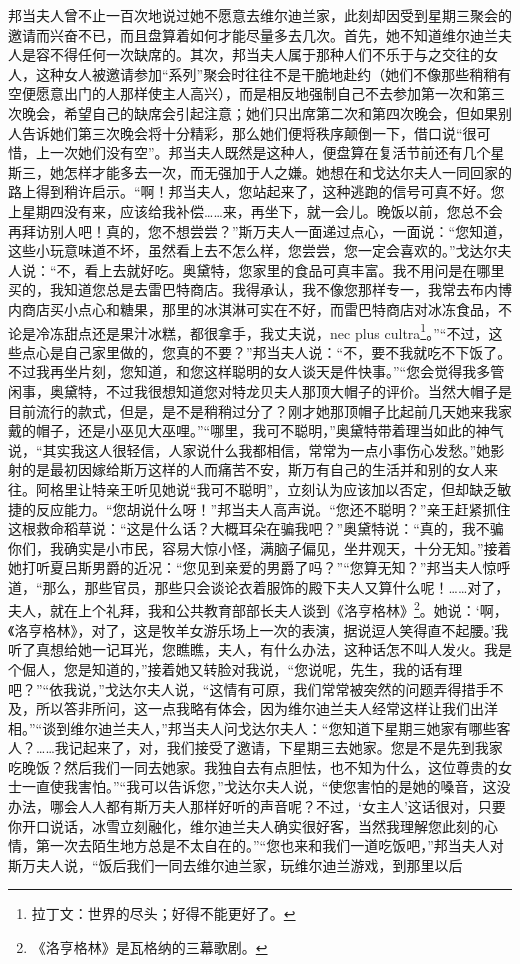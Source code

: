 \par 邦当夫人曾不止一百次地说过她不愿意去维尔迪兰家，此刻却因受到星期三聚会的邀请而兴奋不已，而且盘算着如何才能尽量多去几次。首先，她不知道维尔迪兰夫人是容不得任何一次缺席的。其次，邦当夫人属于那种人们不乐于与之交往的女人，这种女人被邀请参加“系列”聚会时往往不是干脆地赴约（她们不像那些稍稍有空便愿意出门的人那样使主人高兴），而是相反地强制自己不去参加第一次和第三次晚会，希望自己的缺席会引起注意；她们只出席第二次和第四次晚会，但如果别人告诉她们第三次晚会将十分精彩，那么她们便将秩序颠倒一下，借口说“很可惜，上一次她们没有空”。邦当夫人既然是这种人，便盘算在复活节前还有几个星斯三，她怎样才能多去一次，而无强加于人之嫌。她想在和戈达尔夫人一同回家的路上得到稍许启示。“啊！邦当夫人，您站起来了，这种逃跑的信号可真不好。您上星期四没有来，应该给我补偿……来，再坐下，就一会儿。晚饭以前，您总不会再拜访别人吧！真的，您不想尝尝？”斯万夫人一面递过点心，一面说：“您知道，这些小玩意味道不坏，虽然看上去不怎么样，您尝尝，您一定会喜欢的。”戈达尔夫人说：“不，看上去就好吃。奥黛特，您家里的食品可真丰富。我不用问是在哪里买的，我知道您总是去雷巴特商店。我得承认，我不像您那样专一，我常去布内博内商店买小点心和糖果，那里的冰淇淋可实在不好，而雷巴特商店对冰冻食品，不论是冷冻甜点还是果汁冰糕，都很拿手，我丈夫说，nec plus cultra\footnote{拉丁文：世界的尽头；好得不能更好了。}。”“不过，这些点心是自己家里做的，您真的不要？”邦当夫人说：“不，要不我就吃不下饭了。不过我再坐片刻，您知道，和您这样聪明的女人谈天是件快事。”“您会觉得我多管闲事，奥黛特，不过我很想知道您对特龙贝夫人那顶大帽子的评价。当然大帽子是目前流行的款式，但是，是不是稍稍过分了？刚才她那顶帽子比起前几天她来我家戴的帽子，还是小巫见大巫哩。”“哪里，我可不聪明，”奥黛特带着理当如此的神气说，“其实我这人很轻信，人家说什么我都相信，常常为一点小事伤心发愁。”她影射的是最初因嫁给斯万这样的人而痛苦不安，斯万有自己的生活并和别的女人来往。阿格里让特亲王听见她说“我可不聪明”，立刻认为应该加以否定，但却缺乏敏捷的反应能力。“您胡说什么呀！”邦当夫人高声说。“您还不聪明？”亲王赶紧抓住这根救命稻草说：“这是什么话？大概耳朵在骗我吧？”奥黛特说：“真的，我不骗你们，我确实是小市民，容易大惊小怪，满脑子偏见，坐井观天，十分无知。”接着她打听夏吕斯男爵的近况：“您见到亲爱的男爵了吗？”“您算无知？”邦当夫人惊呼道，“那么，那些官员，那些只会谈论衣着服饰的殿下夫人又算什么呢！……对了，夫人，就在上个礼拜，我和公共教育部部长夫人谈到《洛亨格林》\footnote{《洛亨格林》是瓦格纳的三幕歌剧。}。她说：‘啊，《洛亨格林》，对了，这是牧羊女游乐场上一次的表演，据说逗人笑得直不起腰。’我听了真想给她一记耳光，您瞧瞧，夫人，有什么办法，这种话怎不叫人发火。我是个倔人，您是知道的，”接着她又转脸对我说，“您说呢，先生，我的话有理吧？”“依我说，”戈达尔夫人说，“这情有可原，我们常常被突然的问题弄得措手不及，所以答非所问，这一点我略有体会，因为维尔迪兰夫人经常这样让我们出洋相。”“谈到维尔迪兰夫人，”邦当夫人问戈达尔夫人：“您知道下星期三她家有哪些客人？……我记起来了，对，我们接受了邀请，下星期三去她家。您是不是先到我家吃晚饭？然后我们一同去她家。我独自去有点胆怯，也不知为什么，这位尊贵的女士一直使我害怕。”“我可以告诉您，”戈达尔夫人说，“使您害怕的是她的嗓音，这没办法，哪会人人都有斯万夫人那样好听的声音呢？不过，‘女主人’这话很对，只要你开口说话，冰雪立刻融化，维尔迪兰夫人确实很好客，当然我理解您此刻的心情，第一次去陌生地方总是不太自在的。”“您也来和我们一道吃饭吧，”邦当夫人对斯万夫人说，“饭后我们一同去维尔迪兰家，玩维尔迪兰游戏，到那里以后